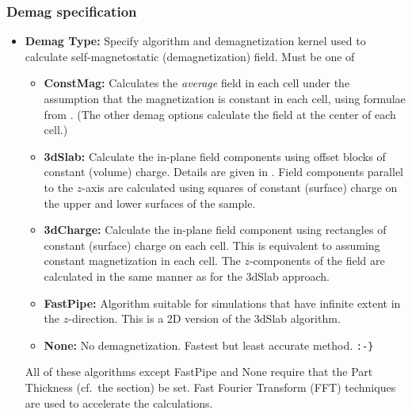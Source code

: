 \subsubsection{Demag specification}\label{sec:mifdemagspec}
\begin{itemize}
   \item {\bf Demag Type:} Specify algorithm and demagnetization kernel
      used to calculate self-magnetostatic
      (demagnetization) field.  Must be one of 
      \begin{itemize}
         \item {\bf ConstMag:} Calculates the {\em average} field in
            each cell under the assumption that the magnetization is
            constant in each cell, using formulae from \cite{newell93}.
            (The other demag options calculate the field at the center
            of each cell.)
         \item {\bf 3dSlab:}  Calculate the in-plane field components
            using offset blocks of constant (volume) charge.  Details
            are given in \cite{berkov93}. Field components parallel to
            the $z$-axis are calculated using squares of constant
            (surface) charge on the upper and lower surfaces of the
            sample.
         \item {\bf 3dCharge:} Calculate the in-plane field component
            using rectangles of constant (surface) charge on each cell.
            This is equivalent to assuming constant magnetization in
            each cell.  The $z$-components of the field are calculated
            in the same manner as for the 3dSlab approach.
         \item {\bf FastPipe:} Algorithm suitable for simulations that
            have infinite extent in the $z$-direction.  This is a 2D
            version of the 3dSlab algorithm.
        \item {\bf None:} No demagnetization.  Fastest but least
            accurate method.  \verb+:-}+    %
    \end{itemize}

    All of these algorithms except FastPipe and None require that the
    Part Thickness (cf.\ the 
    section) be set.  Fast Fourier Transform (FFT) techniques
    are used to accelerate the calculations.

\end{itemize}

